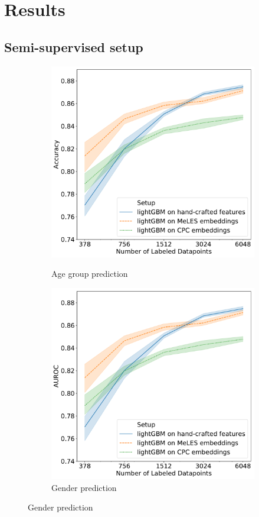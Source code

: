 \documentclass{article}
\begin{document}
\section{Results}

\subsection{Semi-supervised setup}

\begin{figure}
  \centering
  \begin{subfigure}{0.5\linewidth}
    \caption{Age group prediction}
    \includegraphics[width=\linewidth]{figures/ss_age_0.pdf}
    \label{fig-semi-age-0}
  \end{subfigure}%
  \begin{subfigure}{0.5\linewidth}
    \caption{Gender prediction}
    \includegraphics[width=\linewidth]{figures/ss_gen_0.pdf}

\end{subfigure}
\end{figure}
\end{document}
